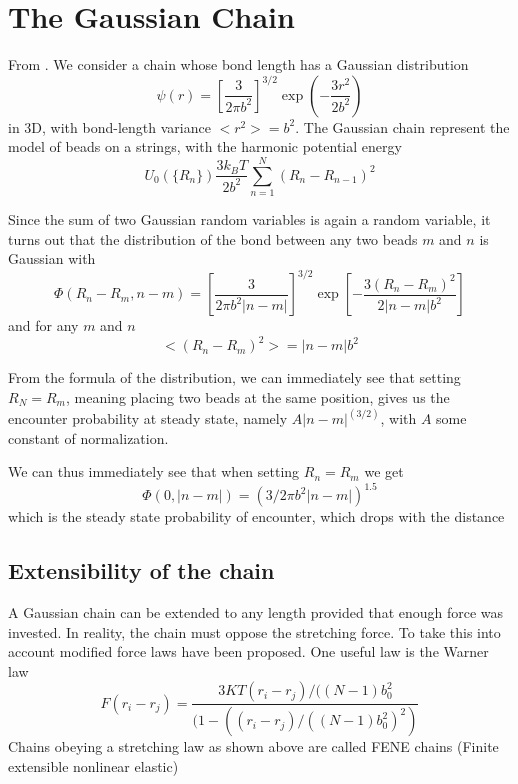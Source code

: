 \documentclass{report}
\begin{document}
\section{The Gaussian Chain}\label{section_theGaussianChain}
From \cite{doi1986theory}. We consider a chain whose bond length has a Gaussian distribution 
\begin{equation*}
\psi(r)=\left[\frac{3}{2\pi b^2} \right]^{3/2} \exp \left( -\frac{3r^2}{2b^2} \right)
\end{equation*}
in 3D,  with bond-length variance $<r^2> =b^2$. The Gaussian chain represent the model of beads on a strings, with the harmonic potential energy 
\begin{equation*}
U_0(\{R_n\})\frac{3k_BT}{2b^2}\sum_{n=1}^N (R_n-R_{n-1})^2
\end{equation*}

Since the sum of two Gaussian random variables is again a random variable, it turns out that the distribution of the bond between any two beads $m$ and $n$ is Gaussian with 
\begin{equation*}
\Phi(R_n-R_m,n-m)=\left[\frac{3}{2\pi b^2 |n-m|}\right]^{3/2}\exp \left[-\frac{3(R_n-R_m)^2}{2|n-m|b^2}\right]
\end{equation*}
and for any $m$ and $n$ 
\begin{equation*}
<(R_n-R_m)^2> = |n-m|b^2
\end{equation*}

From the formula of the distribution, we can immediately see that setting $R_N=R_m$, meaning placing two beads at the same position, gives us the encounter probability at steady state, namely $A|n-m|^(3/2)$, with $A$ some constant of normalization. 

We can thus immediately see that when setting $R_n=R_m$ we get 
\begin{equation*}
\Phi(0,|n-m|)=(3/2\pi b^2 |n-m|)^{1.5}
\end{equation*}
which is the steady state probability of encounter, which drops with the distance


\subsection{Extensibility of the chain}\label{subsection_extensibilitiOfTheChain}
A Gaussian chain can be extended to any length provided that enough force was invested. In reality, the chain must oppose the stretching force. To take this into account modified force laws have been proposed. One useful law is the Warner law
\begin{equation*}
F(r_i -r_j)=\frac{3KT(r_i-r_j)/((N-1)b_0^2}{(1-((r_i-r_j)/((N-1)b_0^2)^2)}
\end{equation*}
Chains obeying a stretching law as shown above are called FENE chains (Finite extensible nonlinear elastic)
\end{document}
